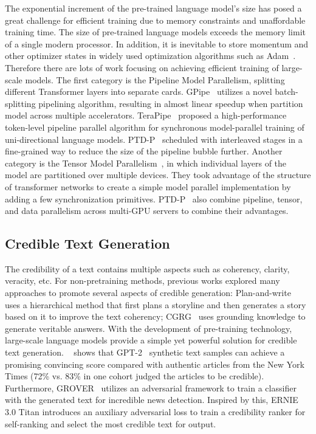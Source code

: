 The exponential increment of the pre-trained language model's size has posed a great challenge for efficient training due to memory constraints and unaffordable training time. The size of pre-trained language models exceeds the memory limit of a single modern processor. In addition,  it is inevitable to store momentum and other optimizer states in widely used optimization algorithms such as Adam~\cite{kingma2014adam}. Therefore there are lots of work focusing on achieving efficient training of large-scale models. The first category is the Pipeline Model Parallelism, splitting different Transformer layers into separate cards. GPipe~\cite{huangGPipeEfficientTraining2019} utilizes a novel batch-splitting pipelining algorithm, resulting in almost linear speedup when partition model across multiple accelerators. TeraPipe~\cite{liTeraPipeTokenLevelPipeline2021} proposed a high-performance token-level pipeline parallel algorithm for synchronous model-parallel training of uni-directional language models. PTD-P~\cite{narayanan2021efficient} scheduled with interleaved stages in a fine-grained way to reduce the size of the pipeline bubble further.  Another category is the Tensor Model Parallelism~\cite{Megatron-LM}, in which individual layers of the model are partitioned over multiple devices. They took advantage of the structure of transformer networks to create a simple model parallel implementation by adding a few synchronization primitives. PTD-P~\cite{narayanan2021efficient} also combine pipeline, tensor, and data parallelism across multi-GPU servers to combine their advantages.

\subsection{Credible Text Generation} The credibility of a text contains multiple aspects such as coherency, clarity, veracity, etc. For non-pretraining methods, previous works explored many approaches to promote several aspects of credible generation: Plan-and-write~\cite{yao2019plan} uses a hierarchical method that first plans a storyline and then generates a story based on it to improve the text coherency; CGRG~\cite{wu2020controllable} uses grounding knowledge to generate veritable answers. With the development of pre-training technology, large-scale language models provide a simple yet powerful solution for credible text generation. ~\cite{kreps2020all} shows that GPT-2~\cite{radford2019language} synthetic text samples can achieve a promising convincing score compared with authentic articles from the New York Times  (72\% vs. 83\% in one cohort judged the articles to be credible). Furthermore, GROVER~\cite{zellers2019defending} utilizes an adversarial framework to train a classifier with the generated text for incredible news detection. Inspired by this, ERNIE 3.0 Titan introduces an auxiliary adversarial loss to train a credibility ranker for self-ranking and select the most credible text for output.

